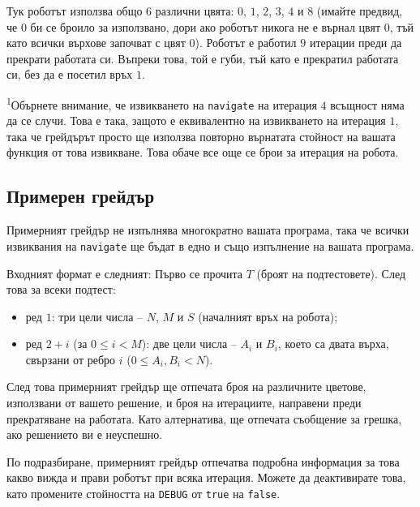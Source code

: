 \documentclass[12pt]{article}
\begin{document}
Тук роботът използва общо $6$ различни цвята: $0$, $1$, $2$, $3$, $4$ и $8$ (имайте предвид, че $0$ би се броило за използвано, дори ако роботът никога не е върнал цвят $0$, тъй като всички върхове започват с цвят $0$). Роботът е работил $9$ итерации преди да прекрати работата си. Въпреки това, той е губи, тъй като е прекратил работата си, без да е посетил връх $1$.

\textsuperscript{1}Обърнете внимание, че извикването на \texttt{navigate} на итерация $4$ всъщност няма да се случи. Това е така, защото е еквивалентно на извикването на итерация $1$, така че грейдърът просто ще използва повторно върнатата стойност на вашата функция от това извикване. Това обаче все още се брои за итерация на робота.

\subsection{Примерен грейдър}

Примерният грейдър не изпълнява многократно вашата програма, така че всички извиквания на \texttt{navigate} ще бъдат в едно и също изпълнение на вашата програма.

Входният формат е следният: Първо се прочита $T$ (броят на подтестовете). След това за всеки подтест:

\begin{itemize}
\item ред $1$: три цели числа -- $N$, $M$ и $S$ (началният връх на робота);
\item ред $2+i$ (за $0 \leq i < M$): две цели числа -- $A_i$ и $B_i$, което са двата върха, свързани от ребро $i$ ($0 \leq A_i, B_i < N$).
\end{itemize}

След това примерният грейдър ще отпечата броя на различните цветове, използвани от вашето решение, и броя на итерациите, направени преди прекратяване на работата. Като алтернатива, ще отпечата съобщение за грешка, ако решението ви е неуспешно.

По подразбиране, примерният грейдър отпечатва подробна информация за това какво вижда и прави роботът при всяка итерация. Можете да деактивирате това, като промените стойността на \texttt{DEBUG} от \texttt{true} на \texttt{false}.
\end{document}

